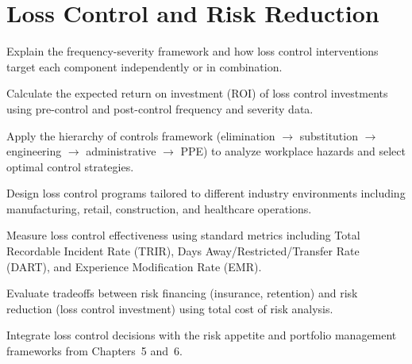 \documentclass[11pt,openany]{book}
\begin{document}
\setcounter{chapter}{6}
\chapter{Loss Control and Risk Reduction}
\label{chap:loss-control}

\begin{learningobjectives}
  \item Explain the frequency-severity framework and how loss control
        interventions target each component independently or in combination.
  \item Calculate the expected return on investment (ROI) of loss control
        investments using pre-control and post-control frequency and severity
        data.
  \item Apply the hierarchy of controls framework (elimination
        \(\rightarrow\) substitution \(\rightarrow\) engineering
        \(\rightarrow\) administrative \(\rightarrow\) PPE) to analyze
        workplace hazards and select optimal control strategies.
  \item Design loss control programs tailored to different industry
        environments including manufacturing, retail, construction, and
        healthcare operations.
  \item Measure loss control effectiveness using standard metrics including
        Total Recordable Incident Rate (TRIR), Days Away/Restricted/Transfer
        Rate (DART), and Experience Modification Rate (EMR).
  \item Evaluate tradeoffs between risk financing (insurance, retention) and
        risk reduction (loss control investment) using total cost of risk
        analysis.
  \item Integrate loss control decisions with the risk appetite and portfolio
        management frameworks from Chapters~5 and~6.
\end{learningobjectives}
\end{document}
